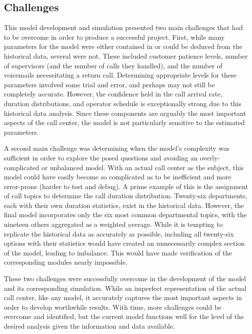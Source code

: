 \documentclass[12pt]{article}
\begin{document}
	\subsection{Challenges}

	This model development and simulation presented two main challenges that had to be overcome in order to produce a successful project.  First, while many parameters for the model were either contained in or could be deduced from the historical data, several were not.  These included customer patience levels, number of supervisors (and the number of calls they handled), and the number of voicemails necessitating a return call.  Determining appropriate levels for these parameters involved some trial and error, and perhaps may not still be completely accurate.  However, the confidence held in the call arrival rate, duration distributions, and operator schedule is exceptionally strong due to this historical data analysis.  Since these components are arguably the most important aspects of the call center, the model is not particularly sensitive to the estimated parameters.
	
	\par
	
	A second main challenge was determining when the model's complexity was sufficient in order to explore the posed questions and avoiding an overly-complicated or unbalanced model.  With an actual call center as the subject, this model could have easily become so complicated as to be inefficient and more error-prone (harder to test and debug).  A prime example of this is the assignment of call topics to determine the call duration distribution.  Twenty-six departments, each with their own duration statistics, exist in the historical data.  However, the final model incorporates only the six most common departmental topics, with the nineteen others aggregated as a weighted average.  While it is tempting to replicate the historical data as accurately as possible, including all twenty-six options with their statistics would have created an unnecessarily complex section of the model, leading to imbalance.  This would have made verification of the corresponding modules nearly impossible.
	
	\par
	
	These two challenges were successfully overcome in the development of the model and its corresponding simulation.  While an imperfect representation of the actual call center, like any model, it accurately captures the most important aspects in order to develop worthwhile results.  With time, more challenges could be overcome and identified, but the current model functions well for the level of the desired analysis given the information and data available.
\end{document}
